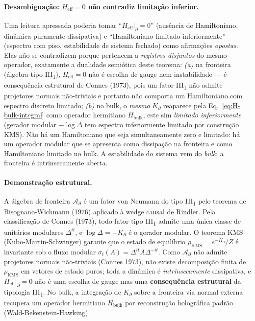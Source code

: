 \documentclass[12pt,a4paper]{article}
\newcommand{\Kpartial}{K_{\partial}}
\begin{document}
\paragraph{Desambiguação: $H_{\text{eff}}=0$ não contradiz limitação inferior.}
Uma leitura apressada poderia tomar ``$H_{\text{eff}}|_\partial = 0$'' (ausência
de Hamiltoniano, dinâmica puramente dissipativa) e ``Hamiltoniano limitado
inferiormente'' (espectro com piso, estabilidade de sistema fechado) como
afirmações \emph{opostas}.  Elas não se contradizem porque pertencem a
\emph{registros disjuntos} do mesmo operador, exatamente a dualidade semiótica
deste teorema: \emph{(a)} na fronteira (álgebra tipo III\textsubscript{1}),
$H_{\text{eff}} = 0$ não é escolha de gauge nem instabilidade --- é consequência
estrutural de Connes (1973), pois um fator III\textsubscript{1} não admite
projetores normais não-triviais e portanto não comporta um Hamiltoniano com
espectro discreto limitado; \emph{(b)} no bulk, o \emph{mesmo} $\Kpartial$
reaparece pela Eq.~\eqref{eq:H-bulk-integral} como operador hermitiano
$H_{\text{bulk}}$, este sim \emph{limitado inferiormente} (gerador modular
$-\log\Delta$ tem espectro inferiormente limitado por construção KMS).  Não há
um Hamiltoniano que seja simultaneamente zero e limitado: há um operador
modular que se apresenta como dissipação na fronteira e como Hamiltoniano
limitado no bulk.  A estabilidade do sistema vem do \emph{bulk}; a fronteira é
intrinsecamente aberta.

\paragraph{Demonstração estrutural.}
A álgebra de fronteira $\mathcal{A}_{\partial}$ é um fator von Neumann do
tipo III\textsubscript{1} pelo teorema de Bisognano-Wichmann (1976) aplicado
à wedge causal de Rindler.  Pela classificação de Connes (1973), todo fator
tipo III\textsubscript{1} admite uma única classe de unitários modulares
$\Delta^{it}$, e $\log \Delta = -\Kpartial$ é o gerador modular.  O
teorema KMS (Kubo-Martin-Schwinger) garante que o estado de equilíbrio
$\rho_{\text{KMS}} = e^{-\Kpartial}/Z$ é invariante sob o fluxo modular
$\sigma_t(A) = \Delta^{it} A \Delta^{-it}$.  Como $\mathcal{A}_{\partial}$
não admite projetores normais não-triviais (Connes 1973), não existe
decomposição finita de $\rho_{\text{KMS}}$ em vetores de estado puros;
toda a dinâmica é \emph{intrinsecamente} dissipativa, e
$H_{\text{eff}}|_{\partial} = 0$ não é uma escolha de gauge mas uma
\textbf{consequência estrutural} da tipologia III\textsubscript{1}.
No bulk, a integração de $\Kpartial$ sobre a fronteira via normal externa
recupera um operador hermitiano $H_{\text{bulk}}$ por reconstrução
holográfica padrão (Wald-Bekenstein-Hawking).
\end{document}
